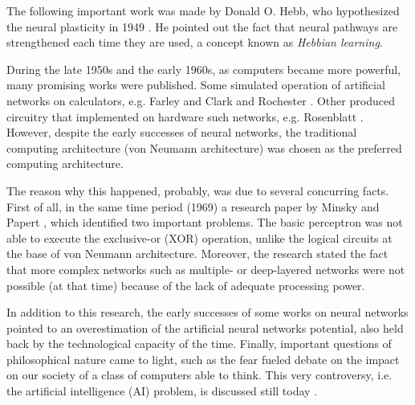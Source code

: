 The following important work was made by Donald O. Hebb, who hypothesized the neural plasticity in 1949 \cite{hebb1949organization}.
He pointed out the fact that neural pathways are strengthened each time they are used, a concept known as \textit{Hebbian learning}.

During the late 1950s and the early 1960s, as computers became more powerful, many promising works were published.
Some simulated operation of artificial networks on calculators, e.g. Farley and Clark \cite{Farley1954} and Rochester \cite{Rochester1956}.
Other produced circuitry that implemented on hardware such networks, e.g. Rosenblatt \cite{frank1957perceptron,Rosenblatt1958}.
However, despite the early successes of neural networks, the traditional computing architecture (von Neumann architecture) was chosen as the preferred computing architecture.

The reason why this happened, probably, was due to several concurring facts.
First of all, in the same time period (1969) a research paper by Minsky and Papert \cite{Minsky1969}, which identified two important problems.
The basic perceptron was not able to execute the exclusive-or (XOR) operation, unlike the logical circuits at the base of von Neumann architecture.
Moreover, the research stated the fact that more complex networks such as multiple- or deep-layered networks were not possible (at that time) because of the lack of adequate processing power.


In addition to this research, the early successes of some works on neural networks pointed to an overestimation of the artificial neural networks potential, also held back by the technological capacity of the time.
Finally, important questions of philosophical nature came to light, such as the fear fueled debate on the impact on our society of a class of computers able to think.
This very controversy, i.e. the artificial intelligence (AI) problem, is discussed still today \cite{stanford.edu}.

